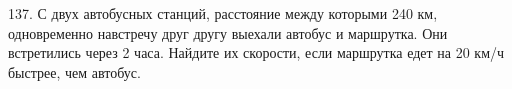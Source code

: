 137. С двух автобусных станций, расстояние между которыми 240 км, одновременно навстречу друг другу выехали автобус и маршрутка. Они встретились через 2 часа. Найдите их скорости, если маршрутка едет на 20 км/ч быстрее, чем автобус.\\
